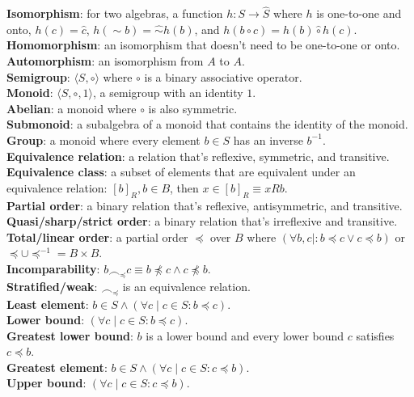 \documentclass[10pt,landscape]{article}
\begin{document}
\begin{multicols}{3}
{\textbf{Isomorphism}: for two algebras, a function $h:S\rightarrow \hat{S}$ where $h$ is one-to-one and onto, $h(c)=\hat{c}$, $h(\sim b)=\hat{\sim}h(b)$, and $h(b\circ c)=h(b)\hat{\circ}h(c)$.\\
\textbf{Homomorphism}: an isomorphism that doesn't need to be one-to-one or onto.\\
\textbf{Automorphism}: an isomorphism from $A$ to $A$.\\
\textbf{Semigroup}: $\langle S,\circ\rangle$ where $\circ$ is a binary associative operator.\\
\textbf{Monoid}: $\langle S,\circ, 1\rangle$, a semigroup with an identity $1$.\\ 
\textbf{Abelian}: a monoid where $\circ$ is also symmetric.\\
\textbf{Submonoid}: a subalgebra of a monoid that contains the identity of the monoid. \\
\textbf{Group}: a monoid where every element $b\in S$ has an inverse $b^{-1}$. \\
\textbf{Equivalence relation}: a relation that's reflexive, symmetric, and transitive.\\
\textbf{Equivalence class}: a subset of elements that are equivalent under an equivalence relation: $[b]_R, b\in B$, then $x\in [b]_R\equiv xRb$. \\
\textbf{Partial order}: a binary relation that's reflexive, antisymmetric, and transitive.\\
\textbf{Quasi/sharp/strict order}: a binary relation that's irreflexive and transitive. \\
\textbf{Total/linear order}: a partial order $\preceq$ over $B$ where $(\forall b,c\mid: b\preceq c\lor c\preceq b)$ or $\preceq\cup\preceq^{-1}=B\times B$.\\
\textbf{Incomparability}: $b\frown_\preceq c\equiv b\not\preceq c\land c\not\preceq b$.\\
\textbf{Stratified/weak}: $\frown_\preceq$ is an equivalence relation.\\
\textbf{Least element}: $b\in S\land (\forall c\mid c\in S: b\preceq c)$.\\
\textbf{Lower bound}: $(\forall c\mid c\in S: b\preceq c)$.\\
\textbf{Greatest lower bound}: $b$ is a lower bound and every lower bound $c$ satisfies $c\preceq b$.\\
\textbf{Greatest element}: $b\in S\land (\forall c\mid c\in S: c\preceq b)$.\\
\textbf{Upper bound}: $(\forall c\mid c\in S: c\preceq b)$.\\
}
\end{multicols}
\end{document}
